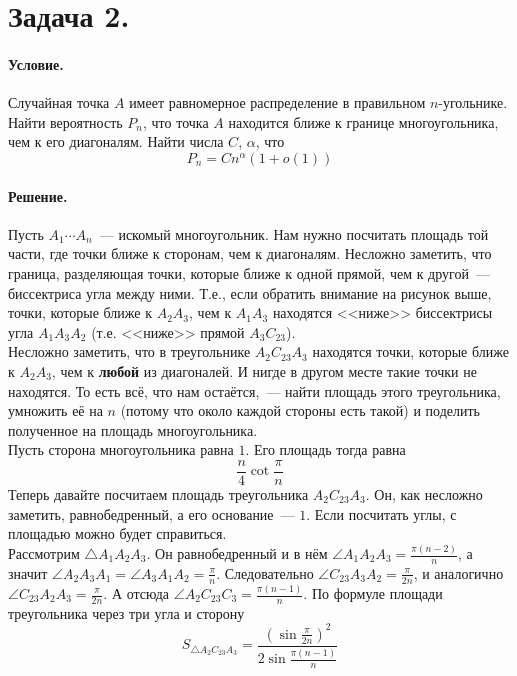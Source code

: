 \documentclass{article}
\begin{document}
    \section{Задача 2.}
    \paragraph{Условие.}
    Случайная точка $A$ имеет равномерное распределение в правильном $n$-угольнике. Найти вероятность $P_n$, что точка $A$ находится ближе к границе многоугольника, чем к его диагоналям. Найти числа $C$, $\alpha$, что
    $$
    P_n=Cn^\alpha(1+o(1))
    $$
    \paragraph{Решение.}
    \begin{figure}[H]
        
    \end{figure}
    Пусть $A_1\cdots A_n$~--- искомый многоугольник. Нам нужно посчитать площадь той части, где точки ближе к сторонам, чем к диагоналям. Несложно заметить, что граница, разделяющая точки, которые ближе к одной прямой, чем к другой~--- биссектриса угла между ними. Т.е., если обратить внимание на рисунок выше, точки, которые ближе к $A_2A_3$, чем к $A_1A_3$ находятся <<ниже>> биссектрисы угла $A_1A_3A_2$ (т.е. <<ниже>> прямой $A_3C_{23}$).\\
    Несложно заметить, что в треугольнике $A_2C_{23}A_3$ находятся точки, которые ближе к $A_2A_3$, чем к \textbf{любой} из диагоналей. И нигде в другом месте такие точки не находятся. То есть всё, что нам остаётся,~--- найти площадь этого треугольника, умножить её на $n$ (потому что около каждой стороны есть такой) и поделить полученное на площадь многоугольника.\\
    Пусть сторона многоугольника равна $1$. Его площадь тогда равна
    $$
    \frac n4\cot\frac\pi n
    $$
    Теперь давайте посчитаем площадь треугольника $A_2C_{23}A_3$. Он, как несложно заметить, равнобедренный, а его основание~--- $1$. Если посчитать углы, с площадью можно будет справиться.\\
    Рассмотрим $\triangle A_1A_2A_3$. Он равнобедренный и в нём $\angle A_1A_2A_3=\frac{\pi(n-2)}n$, а значит $\angle A_2A_3A_1=\angle A_3A_1A_2=\frac\pi n$. Следовательно $\angle C_{23}A_3A_2=\frac{\pi}{2n}$, и аналогично $\angle C_{23}A_2A_3=\frac{\pi}{2n}$. А отсюда $\angle A_2C_{23}C_3=\frac{\pi(n-1)}n$. По формуле площади треугольника через три угла и сторону
    $$
    S_{\triangle A_2C_{23}A_3}=\frac{\left(\sin\frac{\pi}{2n}\right)^2}{2\sin\frac{\pi(n-1)}n}
    $$
\end{document}
